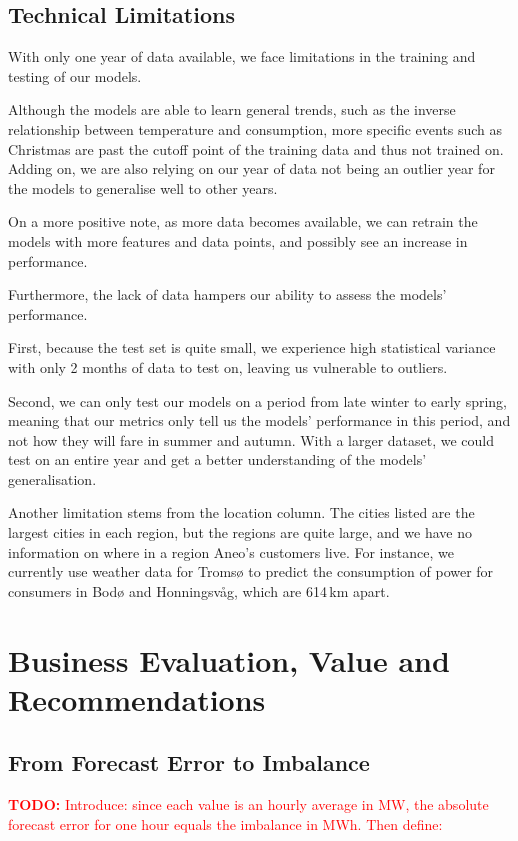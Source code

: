 \documentclass[11pt,a4paper]{article}
\newcommand{\todo}[1]{\textcolor{red}{\textbf{TODO:} #1}}
\newif\ifshowtargets
\newcommand{\pagetarget}[1]{%
  \ifshowtargets
    \noindent{\small\itshape\textcolor{gray}{Target length: #1 pages (indicative)}}\par\medskip
  \fi}
\begin{document}
\subsection{Technical Limitations}
With only one year of data available, we face limitations in the training and testing of our models.

Although the models are able to learn general trends, such as the inverse relationship between temperature and consumption, more specific events such as Christmas are past the cutoff point of the training data and thus not trained on. Adding on, we are also relying on our year of data not being an outlier year for the models to generalise well to other years.

On a more positive note, as more data becomes available, we can retrain the models with more features and data points, and possibly see an increase in performance.

Furthermore, the lack of data hampers our ability to assess the models' performance.

First, because the test set is quite small, we experience high statistical variance with only 2 months of data to test on, leaving us vulnerable to outliers.

Second, we can only test our models on a period from late winter to early spring, meaning that our metrics only tell us the models' performance in this period, and not how they will fare in summer and autumn. With a larger dataset, we could test on an entire year and get a better understanding of the models' generalisation.

Another limitation stems from the location column. The cities listed are the largest cities in each region, but the regions are quite large, and we have no information on where in a region Aneo's customers live. For instance, we currently use weather data for Tromsø to predict the consumption of power for consumers in Bodø and Honningsvåg, which are 614\,km apart.
\newpage

\section{Business Evaluation, Value and Recommendations}
\label{sec:business}
\pagetarget{3--5}

\subsection{From Forecast Error to Imbalance}
\label{sec:imbalance}
\todo{Introduce: since each value is an hourly average in MW, the absolute forecast error for one hour equals the imbalance in MWh. Then define:}
\end{document}
